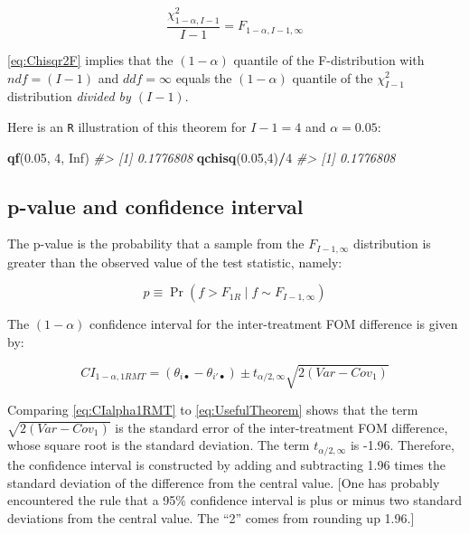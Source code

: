 \documentclass[
]{book}
\newenvironment{Shaded}{\begin{snugshade}}{\end{snugshade}}
\newcommand{\CommentTok}[1]{\textcolor[rgb]{0.56,0.35,0.01}{\textit{#1}}}
\newcommand{\DecValTok}[1]{\textcolor[rgb]{0.00,0.00,0.81}{#1}}
\newcommand{\FloatTok}[1]{\textcolor[rgb]{0.00,0.00,0.81}{#1}}
\newcommand{\KeywordTok}[1]{\textcolor[rgb]{0.13,0.29,0.53}{\textbf{#1}}}
\newcommand{\NormalTok}[1]{#1}
\newcommand{\OperatorTok}[1]{\textcolor[rgb]{0.81,0.36,0.00}{\textbf{#1}}}
\newcommand{\OtherTok}[1]{\textcolor[rgb]{0.56,0.35,0.01}{#1}}
\begin{document}
\begin{equation}
\frac{\chi_{1-\alpha,I-1}^{2}}{I-1} = F_{1-\alpha,I-1,\infty}
\label{eq:Chisqr2F}
\end{equation}

\eqref{eq:Chisqr2F} implies that the \((1-\alpha)\) quantile of the F-distribution with \(ndf=(I-1)\) and \(ddf=\infty\) equals the \((1-\alpha)\) quantile of the \(\chi_{I-1}^2\) distribution \emph{divided by \((I-1)\)}.

Here is an \texttt{R} illustration of this theorem for \(I-1 = 4\) and \(\alpha = 0.05\):

\begin{Shaded}
\begin{Highlighting}[]
\KeywordTok{qf}\NormalTok{(}\FloatTok{0.05}\NormalTok{, }\DecValTok{4}\NormalTok{, }\OtherTok{Inf}\NormalTok{)}
\CommentTok{\#\textgreater{} [1] 0.1776808}
\KeywordTok{qchisq}\NormalTok{(}\FloatTok{0.05}\NormalTok{,}\DecValTok{4}\NormalTok{)}\OperatorTok{/}\DecValTok{4}
\CommentTok{\#\textgreater{} [1] 0.1776808}
\end{Highlighting}
\end{Shaded}

\hypertarget{p-value-and-confidence-interval}{%
\subsection{p-value and confidence interval}\label{p-value-and-confidence-interval}}

The p-value is the probability that a sample from the \(F_{I-1,\infty}\) distribution is greater than the observed value of the test statistic, namely:

\begin{equation}
p\equiv \Pr(f>F_{1R} \mid f \sim F_{I-1,\infty})
\label{eq:pValue1RMT}
\end{equation}

The \((1-\alpha)\) confidence interval for the inter-treatment FOM difference is given by:

\begin{equation}
CI_{1-\alpha,1RMT} = (\theta_{i\bullet} - \theta_{i'\bullet}) \pm t_{\alpha/2,\infty} \sqrt{2(Var-Cov_1)}
\label{eq:CIalpha1RMT}
\end{equation}

Comparing \eqref{eq:CIalpha1RMT} to \eqref{eq:UsefulTheorem} shows that the term \(\sqrt{2(Var-Cov_1)}\) is the standard error of the inter-treatment FOM difference, whose square root is the standard deviation. The term \(t_{\alpha/2,\infty}\) is -1.96. Therefore, the confidence interval is constructed by adding and subtracting 1.96 times the standard deviation of the difference from the central value. {[}One has probably encountered the rule that a 95\% confidence interval is plus or minus two standard deviations from the central value. The ``2'' comes from rounding up 1.96.{]}
\end{document}
